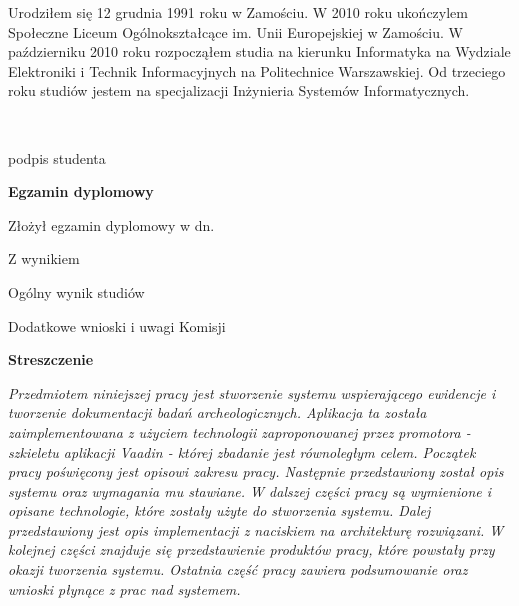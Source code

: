 \begin{titlepage}
    \indent
    Urodziłem się 12 grudnia 1991 roku w Zamościu. W 2010 roku ukończylem Społeczne Liceum Ogólnokształcące im. Unii Europejskiej w Zamościu. W październiku 2010 roku rozpocząłem studia na kierunku Informatyka na Wydziale Elektroniki i Technik Informacyjnych na Politechnice Warszawskiej. Od trzeciego roku studiów jestem na specjalizacji Inżynieria Systemów Informatycznych.
    \par
    \vspace{2\baselineskip}
    \hfill\parbox{15em}{{\small\dotfill}\\[-.3ex]
    \centerline{\footnotesize podpis studenta}}\par
    \vspace{1\baselineskip}
    \begin{center}
 	{\large\bfseries Egzamin dyplomowy} \par\bigskip\bigskip
    \end{center}
    \par\noindent\vspace{1.5\baselineskip}
    Złożył egzamin dyplomowy w dn. \dotfill
    \par\noindent\vspace{1.5\baselineskip}
    Z wynikiem \dotfill
    \par\noindent\vspace{1.5\baselineskip}
    Ogólny wynik studiów \dotfill
    \par\noindent\vspace{1.5\baselineskip}
    Dodatkowe wnioski i uwagi Komisji \dotfill
    \par\noindent\vspace{1.5\baselineskip}
    \dotfill

    \newpage\thispagestyle{empty}
    \vspace*{2\baselineskip}
    \begin{center}
	{\large\bfseries Streszczenie}\par\bigskip
    \end{center}

    {\itshape
    Przedmiotem niniejszej pracy jest stworzenie systemu wspierającego ewidencje i tworzenie dokumentacji badań archeologicznych. Aplikacja ta została zaimplementowana z użyciem technologii zaproponowanej przez promotora - szkieletu aplikacji Vaadin - której zbadanie jest równoległym celem. Początek pracy poświęcony jest opisowi zakresu pracy. Następnie przedstawiony został opis systemu oraz wymagania mu stawiane. W dalszej części pracy są wymienione i opisane technologie, które zostały użyte do stworzenia systemu. Dalej przedstawiony jest opis implementacji z naciskiem na architekturę rozwiązani. W kolejnej części znajduje się przedstawienie produktów pracy, które powstały przy okazji tworzenia systemu. Ostatnia część pracy zawiera podsumowanie oraz wnioski płynące z prac nad systemem.}
    \vspace*{1\baselineskip}


\end{titlepage}
